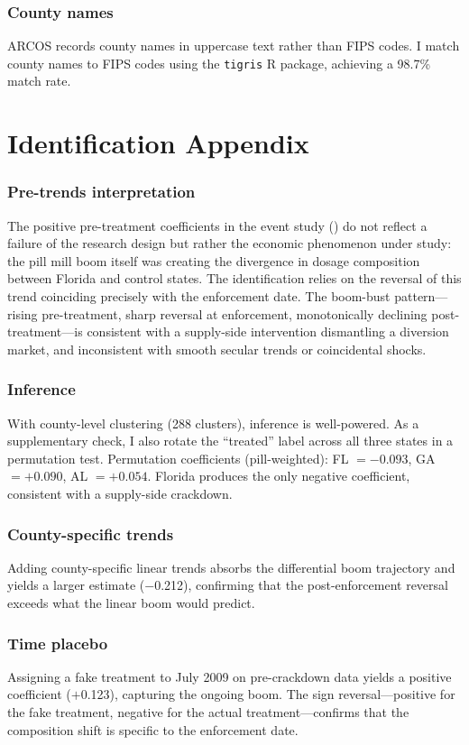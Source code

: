 \documentclass[12pt]{article}
\begin{document}
\subsubsection*{County names} ARCOS records county names in uppercase text rather than FIPS codes. I match county names to FIPS codes using the \texttt{tigris} R package, achieving a 98.7\% match rate.


\section{Identification Appendix}

\subsubsection*{Pre-trends interpretation} The positive pre-treatment coefficients in the event study () do not reflect a failure of the research design but rather the economic phenomenon under study: the pill mill boom itself was creating the divergence in dosage composition between Florida and control states. The identification relies on the reversal of this trend coinciding precisely with the enforcement date. The boom-bust pattern---rising pre-treatment, sharp reversal at enforcement, monotonically declining post-treatment---is consistent with a supply-side intervention dismantling a diversion market, and inconsistent with smooth secular trends or coincidental shocks.

\subsubsection*{Inference} With county-level clustering (288 clusters), inference is well-powered. As a supplementary check, I also rotate the ``treated'' label across all three states in a permutation test. Permutation coefficients (pill-weighted): FL $= -0.093$, GA $= +0.090$, AL $= +0.054$. Florida produces the only negative coefficient, consistent with a supply-side crackdown.

\subsubsection*{County-specific trends} Adding county-specific linear trends absorbs the differential boom trajectory and yields a larger estimate ($-$0.212), confirming that the post-enforcement reversal exceeds what the linear boom would predict.

\subsubsection*{Time placebo} Assigning a fake treatment to July 2009 on pre-crackdown data yields a positive coefficient ($+$0.123), capturing the ongoing boom. The sign reversal---positive for the fake treatment, negative for the actual treatment---confirms that the composition shift is specific to the enforcement date.
\end{document}
